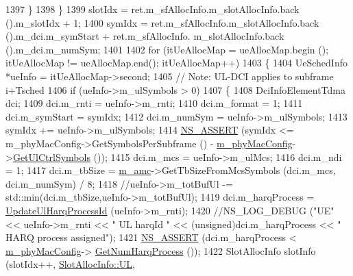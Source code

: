 \begin{DoxyCode}
1397                 \}
1398         \}
1399         slotIdx = ret.m\_sfAllocInfo.m\_slotAllocInfo.back ().m\_slotIdx + 1;
1400         symIdx = ret.m\_sfAllocInfo.m\_slotAllocInfo.back ().m\_dci.m\_symStart + ret.m\_sfAllocInfo.
      m\_slotAllocInfo.back ().m\_dci.m\_numSym;
1401 
1402         \textcolor{keywordflow}{for} (itUeAllocMap = ueAllocMap.begin (); itUeAllocMap != ueAllocMap.end(); itUeAllocMap++)
1403         \{
1404                 UeSchedInfo *ueInfo = itUeAllocMap->second;
1405                 \textcolor{comment}{// Note: UL-DCI applies to subframe i+Tsched}
1406                 \textcolor{keywordflow}{if} (ueInfo->m\_ulSymbols > 0)
1407                 \{
1408                         DciInfoElementTdma dci;
1409                         dci.m\_rnti = ueInfo->m\_rnti;
1410                         dci.m\_format = 1;
1411                         dci.m\_symStart = symIdx;
1412                         dci.m\_numSym = ueInfo->m\_ulSymbols;
1413                         symIdx += ueInfo->m\_ulSymbols;
1414                         \hyperlink{assert_8h_a6dccdb0de9b252f60088ce281c49d052}{NS\_ASSERT} (symIdx <= m\_phyMacConfig->GetSymbolsPerSubframe () - 
      \hyperlink{classns3_1_1MmWaveMacScheduler_a24d7af4971d2e500fe543cefbafa2fd9}{m\_phyMacConfig}->\hyperlink{classns3_1_1MmWavePhyMacCommon_aa0bf8af14050bc5dc6513fbc86319a9b}{GetUlCtrlSymbols} ());
1415                         dci.m\_mcs = ueInfo->m\_ulMcs;
1416                         dci.m\_ndi = 1;
1417                         dci.m\_tbSize = \hyperlink{classns3_1_1MmWaveFlexTtiMaxRateMacScheduler_a8a84d69426586fddd45abe7174da607d}{m\_amc}->GetTbSizeFromMcsSymbols (dci.m\_mcs, dci.m\_numSym) / 8;
1418                         \textcolor{comment}{//ueInfo->m\_totBufUl -= std::min(dci.m\_tbSize,ueInfo->m\_totBufUl);}
1419                         dci.m\_harqProcess = \hyperlink{classns3_1_1MmWaveFlexTtiMaxRateMacScheduler_a2090c4af5019cdd2d914871e51d259f4}{UpdateUlHarqProcessId} (ueInfo->m\_rnti);
1420                         \textcolor{comment}{//NS\_LOG\_DEBUG ("UE" << ueInfo->m\_rnti << " UL harqId " <<
       (unsigned)dci.m\_harqProcess << " HARQ process assigned");}
1421                         \hyperlink{assert_8h_a6dccdb0de9b252f60088ce281c49d052}{NS\_ASSERT} (dci.m\_harqProcess < \hyperlink{classns3_1_1MmWaveMacScheduler_a24d7af4971d2e500fe543cefbafa2fd9}{m\_phyMacConfig}->
      \hyperlink{classns3_1_1MmWavePhyMacCommon_a40773d84172ebeb5aff125f56ebcc5ac}{GetNumHarqProcess} ());
1422                         SlotAllocInfo slotInfo (slotIdx++, \hyperlink{structns3_1_1SlotAllocInfo_a6cad60db1d39034f1851e2cea625fe5da916b5be54594ead6ed677c570311cad2}{SlotAllocInfo::UL}, 

\end{DoxyCode}
